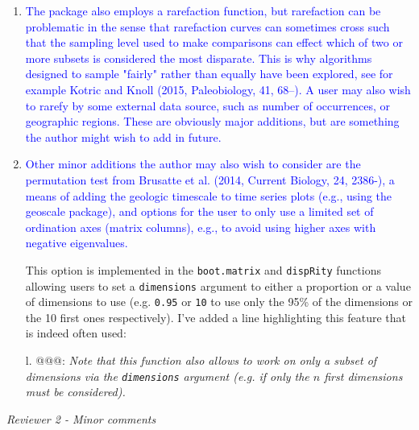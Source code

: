 \documentclass[12pt,letterpaper]{article}
\renewcommand{\subsection}[1]{%
\bigskip
\begin{center}
\begin{large}
\normalfont\itshape #1
\end{large}
\end{center}}
\begin{document}
\begin{enumerate}

\item{\textcolor{blue}{The package also employs a rarefaction function, but rarefaction can be problematic in the sense that rarefaction curves can sometimes cross such that the sampling level used to make comparisons can effect which of two or more subsets is considered the most disparate. This is why algorithms designed to sample "fairly" rather than equally have been explored, see for example Kotric and Knoll (2015, Paleobiology, 41, 68–). A user may also wish to rarefy by some external data source, such as number of occurrences, or geographic regions. These are obviously major additions, but are something the author might wish to add in future.}}


\item{\textcolor{blue}{Other minor additions the author may also wish to consider are the permutation test from Brusatte et al. (2014, Current Biology, 24, 2386-), a means of adding the geologic timescale to time series plots (e.g., using the geoscale package), and options for the user to only use a limited set of ordination axes (matrix columns), e.g., to avoid using higher axes with negative eigenvalues.}}

This option is implemented in the \texttt{boot.matrix} and \texttt{dispRity} functions allowing users to set a \texttt{dimensions} argument to either a proportion or a value of dimensions to use (e.g. \texttt{0.95} or \texttt{10} to use only the 95\% of the dimensions or the 10 first ones respectively). I've added a line highlighting this feature that is indeed often used:

l. @@@: \textit{Note that this function also allows to work on only a subset of dimensions via the \texttt{dimensions} argument (e.g. if only the $n$ first dimensions must be considered).}

\end{enumerate}

\subsection{Reviewer 2 - Minor comments}
\end{document}
